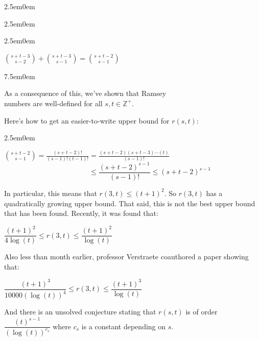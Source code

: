 \documentclass{book}
\newcommand{\hThree}{%
   \color{PineGreen}
   \fontsize{13}{15}\selectfont%
}
\newcommand{\teachComment}{
   \color{Orange}%
   \fontsize{12}{14}\selectfont%
}
\newenvironment{myIndent}{%
   \begin{adjustwidth}{2.5em}{0em}%
}{%
   \end{adjustwidth}%
}
\newenvironment{myTindent}{%
   \begin{adjustwidth}{7.5em}{0em}%
}{%
   \end{adjustwidth}%
}
\newcommand{\retTwo}{\hfill\bigbreak}
\begin{document}
{\begin{myIndent}
{\begin{myIndent}
{\begin{myIndent}
         {\center ${\displaystyle \binom{s+t-3}{s-2}} + {\displaystyle \binom{s+t-3}{s-1}} = {\displaystyle \binom{s+t-2}{s-1}} $\retTwo\par}

         {\begin{myTindent} \teachComment
            As a consequence of this, we've shown that Ramsey\\ numbers are well-defined for all $s, t \in \mathbb{Z}^+$.
         \end{myTindent}}
      \end{myIndent}}
   \end{myIndent}}

   \newpage%

   Here's how to get an easier-to-write upper bound for $r(s, t)$:

   
   {\begin{myIndent} \hThree
      ${\displaystyle \binom{s+t-2}{s-1}} = {\displaystyle \frac{(s+t-2)!}{(s-1)!(t-1)!}} = {\displaystyle \frac{(s+t-2)(s+t-3)\cdots(t)}{(s-1)!}}$\\
      $\phantom{{\displaystyle \binom{s+t-2}{s-1}} = {\displaystyle \frac{(s+t-2)!}{(s-1)!(t-1)!}}} \leq \dfrac{(s+t-2)^{s-1}}{(s-1)!} \leq (s+t-2)^{s-1}$
      \retTwo
   \end{myIndent}}

   In particular, this means that $r(3, t) \leq  (t+1)^2$. So $r(3, t)$ has a quadratically growing upper bound. That said, this is not the best upper bound that has been found. Recently, it was found that:

   {\center $\dfrac{(t+1)^2}{4\log(t)} \leq r(3, t) \leq \dfrac{(t+1)^2}{\log(t)}$ \retTwo\par}

   Also less than month earlier, professor Verstraete coauthored a paper showing that:

   {\center $\dfrac{(t+1)^3}{10000(\log(t))^4} \leq r(3, t) \leq \dfrac{(t+1)^3}{\log(t)}$ \retTwo\par}

   And there is an unsolved conjecture stating that $r(s, t)$ is of order $\dfrac{(t)^{s-1}}{(\log(t))^{c_s}}$ where $c_s$ is a constant depending on $s$.


\end{myIndent}}
\end{document}
